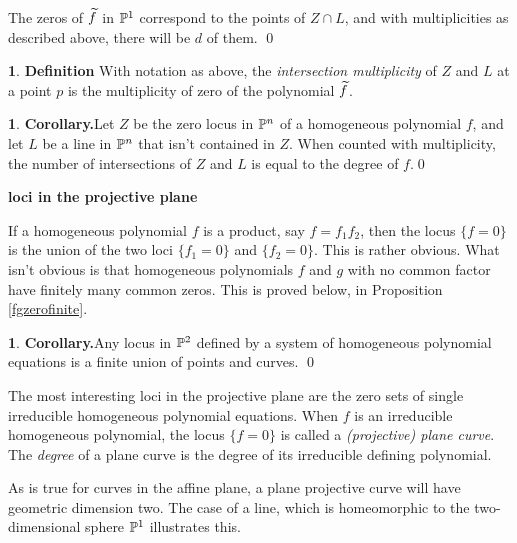 \documentclass[leqno]{book}
\newcommand\Marginnote[1]{\marginnote{\hspace{-12pt}\normalfont{#1}}}
\renewcommand\theequation{\thesection.\arabic{equation}}
\newenvironment{boldequation}{\renewcommand\theequation{\textbf{\thesection.\arabic{equation}}}\equation}
   {\endequation}
\theoremstyle{definition}%
\numberwithin{equation}{section}
\newtheorem{definition}[equation]{}
\theoremstyle{theorem} %
\newtheorem{corollary}[equation]{}
\begin{document}
\msno
The
zeros of $\widetilde f$ in $\mathbb{P}^1$ correspond to the points of $Z\cap
L$, and with multiplicities as described above, there will be $d$ of
them.  \qed

\ms
\begin{definition}{\bf Definition}
\label{intersectlinetwo}
With notation as above, the {\it intersection multiplicity} of $Z$ and
$L$ at a point $p$ is the multiplicity of zero of the polynomial 
$\widetilde f$. \end{definition}


\begin{corollary}{\bf Corollary.}\label{XcapL}
Let $Z$ be the zero locus in $\mathbb{P}^n$ of a homogeneous polynomial $f$,
and let $L$ be a line in $\mathbb{P}^n$ that isn't contained in $Z$. When
counted with multiplicity, the number of intersections of $Z$ and $L$
is equal to the degree of $f$.\qed\end{corollary}


\begin{boldequation}
\hspace{-8.5cm} \textbf{loci in the projective plane}
\Marginnote{lociptwo}\label{lociptwo}
\end{boldequation}


\msno If a homogeneous polynomial $f$ is a product, say $f = f_1f_2$,
then the locus $\{f = 0\}$ is the union of the two loci $\{f_1=0\}$
and $\{f_2=0\}$.  This is rather obvious.  What  isn't obvious is that
homogeneous polynomials $f$ and $g$ with no common factor have
finitely many common zeros.  This is proved below, in Proposition
\ref{fgzerofinite}.


\begin{corollary}{\bf Corollary.}\label{pointscurves}
Any locus in $\mathbb{P}^2$ defined by a system of
homogeneous polynomial equations is a finite union of points and
curves.  \qed\end{corollary}

The most interesting loci in the projective plane are
the zero sets of single irreducible homogeneous polynomial equations.
When $f$ is an irreducible homogeneous polynomial, the locus $\{f=0\}$
is called a {\it (projective) plane curve}.   The {\it degree} of a plane
curve is  the degree of its irreducible defining
polynomial.



As is true for curves in the affine plane, a plane projective curve
will have geometric dimension two.  The case of a line, which is
homeomorphic to the two-dimensional sphere $\mathbb{P}^1$ illustrates this.
\end{document}
